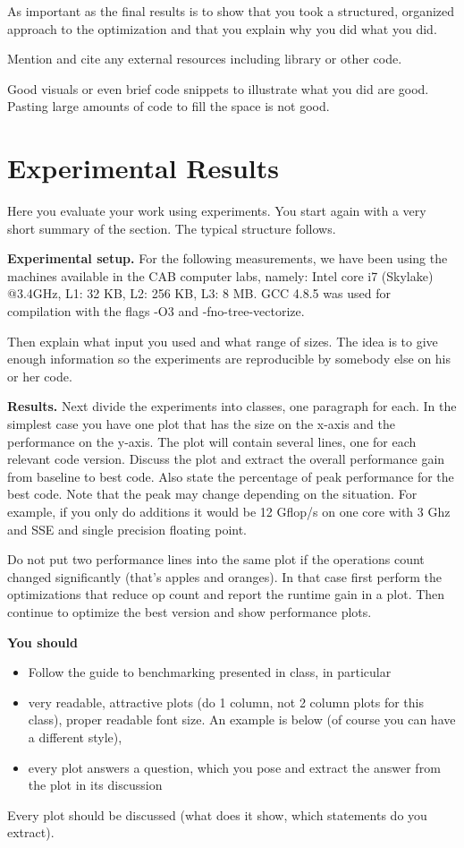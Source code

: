 \documentclass[letterpaper]{article}
\newcommand{\mypar}[1]{{\bf #1.}}
\begin{document}
As important as the final results is to show that you took a structured, organized approach to the optimization and that you explain why you did what you did.

Mention and cite any external resources including library or other code.

Good visuals or even brief code snippets to illustrate what you did are good. Pasting large amounts of code to fill the space is not good.

\section{Experimental Results}\label{sec:exp}

Here you evaluate your work using experiments. You start again with a
very short summary of the section. The typical structure follows.

\mypar{Experimental setup} For the following measurements, we have been using the machines available in the CAB computer labs, namely: Intel core i7 (Skylake) @3.4GHz, L1: 32 KB, L2: 256 KB, L3: 8 MB. GCC 4.8.5 was used for compilation with the flags -O3 and -fno-tree-vectorize.

Then explain what input you used and what range of sizes. The idea is to give enough information so the experiments are reproducible by somebody else on his or her code.

\mypar{Results}
Next divide the experiments into classes, one paragraph for each. In the simplest case you have one plot that has the size on the x-axis and the performance on the y-axis. The plot will contain several lines, one for each relevant code version. Discuss the plot and extract the overall performance gain from baseline to best code. Also state the percentage of peak performance for the best code. Note that the peak may change depending on the situation. For example, if you only do additions it would be 12 Gflop/s
on one core with 3 Ghz and SSE and single precision floating point.

Do not put two performance lines into the same plot if the operations count changed significantly (that's apples and oranges). In that case first perform the optimizations that reduce op count and report the runtime gain in a plot. Then continue to optimize the best version and show performance plots.

{\bf You should}
\begin{itemize}
\item Follow the guide to benchmarking presented in class, in particular
\item very readable, attractive plots (do 1 column, not 2 column plots
for this class), proper readable font size. An example is below (of course you can have a different style),
\item every plot answers a question, which you pose and extract the
answer from the plot in its discussion
\end{itemize}
Every plot should be discussed (what does it show, which statements do
you extract).
\end{document}
